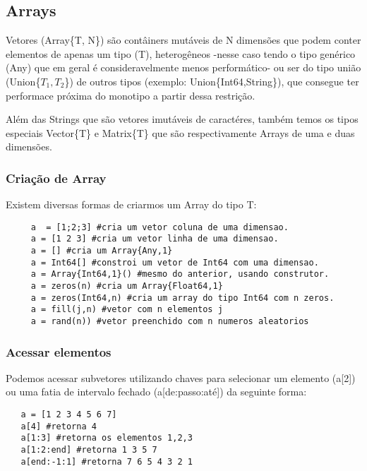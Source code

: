 \subsection{Arrays}
Vetores (Array\{T, N\}) são contâiners mutáveis de N dimensões que podem conter elementos de apenas um tipo (T), heterogêneos -nesse caso tendo o tipo genérico (Any) que em geral é consideravelmente menos performático- ou ser do tipo união (Union\{$T_1,T_2$\}) de outros tipos (exemplo: Union\{Int64,String\}), que consegue ter performace próxima do monotipo a partir dessa restrição.

Além das Strings que são vetores imutáveis de caractéres, também temos os tipos especiais Vector\{T\} e Matrix\{T\} que são respectivamente Arrays de uma e duas dimensões.

\subsubsection{Criação de Array}
Existem diversas formas de criarmos um Array do tipo T:
\begin{lstlisting}
     a  = [1;2;3] #cria um vetor coluna de uma dimensao.
     a = [1 2 3] #cria um vetor linha de uma dimensao.
     a = [] #cria um Array{Any,1}
     a = Int64[] #constroi um vetor de Int64 com uma dimensao.
     a = Array{Int64,1}() #mesmo do anterior, usando construtor.
     a = zeros(n) #cria um Array{Float64,1}
     a = zeros(Int64,n) #cria um array do tipo Int64 com n zeros.
     a = fill(j,n) #vetor com n elementos j
     a = rand(n)) #vetor preenchido com n numeros aleatorios
\end{lstlisting}

\subsubsection{Acessar elementos}
Podemos acessar subvetores utilizando chaves para selecionar um elemento (a[2]) ou uma fatia de intervalo fechado (a[de:passo:até]) da seguinte forma:
\begin{lstlisting}
   a = [1 2 3 4 5 6 7] 
   a[4] #retorna 4
   a[1:3] #retorna os elementos 1,2,3
   a[1:2:end] #retorna 1 3 5 7
   a[end:-1:1] #retorna 7 6 5 4 3 2 1
\end{lstlisting}

